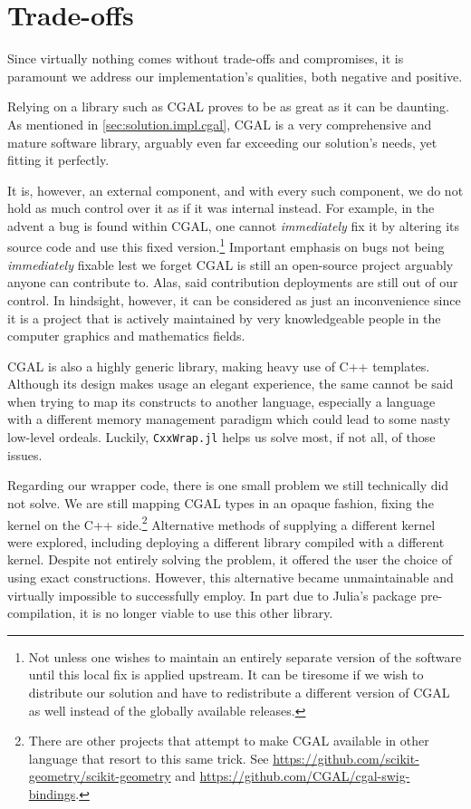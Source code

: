 \section{Trade-offs}%
\label{sec:solution.tradeoffs}

Since virtually nothing comes without trade-offs and compromises, it is
paramount we address our implementation's qualities, both negative and positive.

Relying on a library such as \ac{CGAL} proves to be as great as it can be
daunting.  As mentioned in \cref{sec:solution.impl.cgal}, \ac{CGAL} is a very
comprehensive and mature software library, arguably even far exceeding our
solution's needs, yet fitting it perfectly.

It is, however, an external component, and with every such component, we do not
hold as much control over it as if it was internal instead.  For example, in the
advent a bug is found within \ac{CGAL}, one cannot \emph{immediately} fix it by
altering its source code and use this fixed version.\footnote{Not unless one
wishes to maintain an entirely separate version of the software until this local
fix is applied upstream.  It can be tiresome if we wish to distribute our
solution and have to redistribute a different version of \ac{CGAL} as well
instead of the globally available releases.}  Important emphasis on bugs not
being \emph{immediately} fixable lest we forget \ac{CGAL} is still an
open-source project arguably anyone can contribute to.  Alas, said contribution
deployments are still out of our control.  In hindsight, however, it can be
considered as just an inconvenience since it is a project that is actively
maintained by very knowledgeable people in the computer graphics and mathematics
fields.

\Ac{CGAL} is also a highly generic library, making heavy use of C++ templates.
Although its design makes usage an elegant experience, the same cannot be said
when trying to map its constructs to another language, especially a language
with a different memory management paradigm which could lead to some nasty
low-level ordeals.  Luckily, \texttt{CxxWrap.jl} helps us solve most, if not
all, of those issues.

Regarding our wrapper code, there is one small problem we still technically did
not solve.  We are still mapping \ac{CGAL} types in an opaque fashion, fixing
the kernel on the C++ side.\footnote{There are other projects that attempt to
make \ac{CGAL} available in other language that resort to this same trick. See
\url{https://github.com/scikit-geometry/scikit-geometry} and
\url{https://github.com/CGAL/cgal-swig-bindings}.}  Alternative methods of
supplying a different kernel were explored, including deploying a different
library compiled with a different kernel.  Despite not entirely solving the
problem, it offered the user the choice of using exact constructions.  However,
this alternative became unmaintainable and virtually impossible to successfully
employ.  In part due to Julia's package pre-compilation, it is no longer viable
to use this other library.

